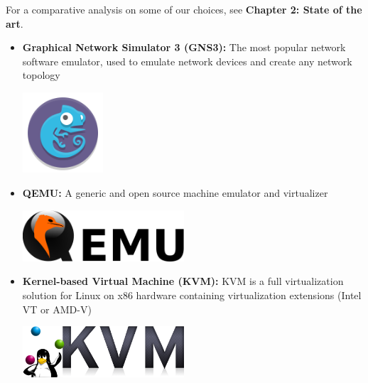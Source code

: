 \medskip
For a comparative analysis on some of our choices, see \textbf {Chapter 2: State of the art}.

\begin{itemize}
    \item \textbf{Graphical Network Simulator 3 (GNS3):} \newline The most popular network software emulator, used to emulate network devices and create any network topology \newline
          \begin{minipage}{\linewidth}
              \centering
              \includegraphics[width=3cm]{src/assets/logos/gns3_94911_500x500.png}
          \end{minipage}
    \item \textbf{QEMU:} \newline \cite{qemu} A generic and open source machine emulator and virtualizer \newline \newline
          \begin{minipage}{\linewidth}
              \centering
              \includegraphics[width=6cm]{src/assets/logos/qemu_logo.png}
          \end{minipage}
          \newline
    \item \textbf{Kernel-based Virtual Machine (KVM):} \newline \cite{kvm} KVM is a full virtualization solution for Linux on x86 hardware containing virtualization extensions (Intel VT or AMD-V) \newline \newline
          \begin{minipage}{\linewidth}
              \centering
              \includegraphics[width=6cm]{src/assets/logos/kvm_banner_logo.png}
          \end{minipage}
          \newpage


\end{itemize}
